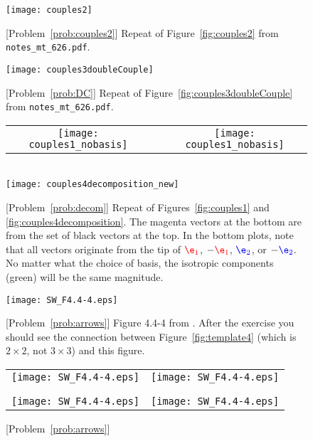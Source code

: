\documentclass[11pt,titlepage,fleqn]{article}
\newcommand{\mtfile}{\texttt{notes\_mt\_626.pdf}}
\newcommand{\eone}{\textcolor{red}{\e_1}}
\newcommand{\etwo}{\textcolor{blue}{\e_2}}
\begin{document}
\begin{figure}
\hspace{-1cm}
\texttt{[image: couples2]}
\caption{
[Problem~\ref{prob:couples2}] 
Repeat of Figure~\ref{fig:couples2} from \mtfile.
\label{fig:template_couples2}
}
\end{figure}

\begin{figure}
\hspace{-1cm}
\texttt{[image: couples3doubleCouple]}
\caption{
[Problem~\ref{prob:DC}] 
Repeat of Figure~\ref{fig:couples3doubleCouple} from \mtfile.
\label{fig:templateDC}
}
\end{figure}

\begin{figure}
\centering
\begin{tabular}{ccc}
\texttt{[image: couples1\_nobasis]}
& \hspace{1.4cm} &
\texttt{[image: couples1\_nobasis]}
\end{tabular}
\\
\makebox{\hspace{0.5cm}}
\texttt{[image: couples4decomposition\_new]}
\caption{
[Problem~\ref{prob:decom}]
Repeat of Figures~\ref{fig:couples1} and \ref{fig:couples4decomposition}.
The magenta vectors at the bottom are from the set of black vectors at the top.
In the bottom plots, note that all vectors originate from the tip of $\eone$, $-\eone$, $\etwo$, or $-\etwo$.
No matter what the choice of basis, the isotropic components (green) will be the same magnitude.
\label{fig:decom}
}
\end{figure}


\begin{figure}
\centering
\texttt{[image: SW\_F4.4-4.eps]}
\caption{
[Problem~\ref{prob:arrows}]
Figure 4.4-4 from \citet{SteinWysession}.
After the exercise you should see the connection between Figure~\ref{fig:template4} (which is $2 \times 2$, not $3 \times 3$) and this figure.
\label{fig:SW}
}
\end{figure}

\begin{figure}
\hspace{-1cm}
\begin{tabular}{c|c}
\texttt{[image: SW\_F4.4-4.eps]} & \texttt{[image: SW\_F4.4-4.eps]} \\
& \\ \hline
& \\
\texttt{[image: SW\_F4.4-4.eps]} & \texttt{[image: SW\_F4.4-4.eps]} 
\end{tabular}
\caption{
[Problem~\ref{prob:arrows}]
\label{fig:SWfour}
}
\end{figure}

\clearpage\pagebreak



\end{document}
